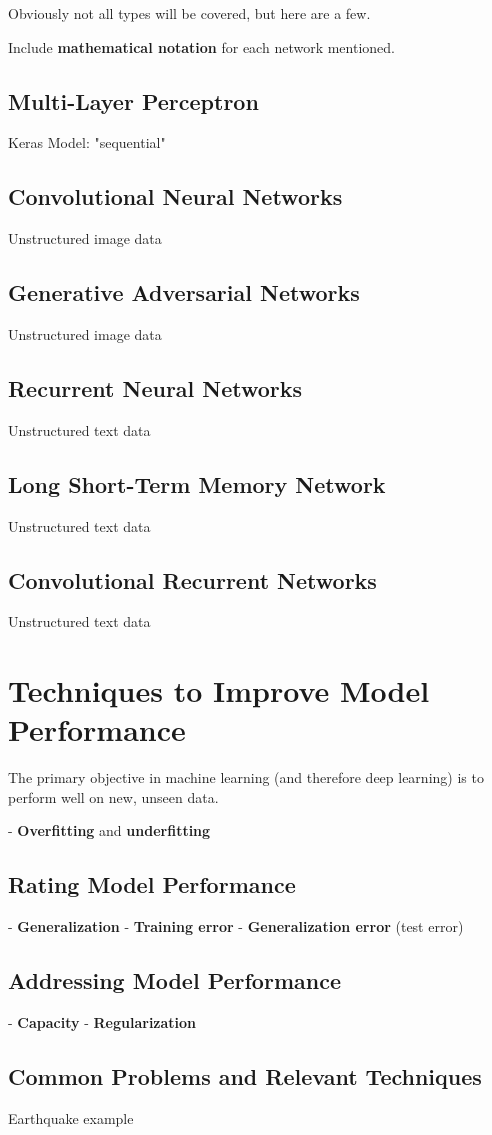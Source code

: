 Obviously not all types will be covered, but here are a few.  

Include \textbf{mathematical notation} for each network mentioned.

\subsection{Multi-Layer Perceptron}
Keras Model: "sequential"

\subsection{Convolutional Neural Networks}
Unstructured image data

\subsection{Generative Adversarial Networks}
Unstructured image data

\subsection{Recurrent Neural Networks}
Unstructured text data

\subsection{Long Short-Term Memory Network}
Unstructured text data

\subsection{Convolutional Recurrent Networks}
Unstructured text data

\section{Techniques to Improve Model Performance} %

The primary objective in machine learning (and therefore deep learning) is to perform well on new, unseen data. 

- \textbf{Overfitting} and \textbf{underfitting}

\subsection{Rating Model Performance}
- \textbf{Generalization}
- \textbf{Training error}  
- \textbf{Generalization error} (test error)

\subsection{Addressing Model Performance}
- \textbf{Capacity}
- \textbf{Regularization}

\subsection{Common Problems and Relevant Techniques}

Earthquake example